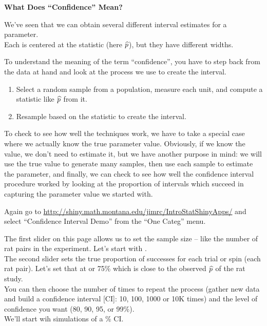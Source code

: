 
\def\theTopic{Confidence }
\def\dayNum{7}

\begin{center}
\vspace*{-.2in}
{\bf {\large What Does ``Confidence'' Mean?}}\\
\end{center}

We've seen that we can obtain several different interval estimates for
a parameter. \\
  Each is centered at the statistic (here $\widehat{p}$), but they have
  different widths.

To understand the meaning of the term ``confidence'', you have to step
back from the data at hand and look at the process we use to create
the interval.
\begin{enumerate}
  \item Select a random sample from a population, measure each unit,
    and compute a  statistic like $\widehat{p}$ from it.
  \item Resample based on the statistic to create the interval.
\end{enumerate}

 To check to see how well the techniques work, we have to take a
 special case where we actually know the true parameter value.
 Obviously, if we know the value, we don't need to estimate it, but we
 have another purpose in mind: we will use the true value to generate
 many samples, then use each sample to estimate the parameter, and
 finally, we can check to see how well the confidence interval
 procedure worked by looking at the proportion of intervals which
 succeed in capturing the parameter value we started with.

 Again go to \url{http://shiny.math.montana.edu/jimrc/IntroStatShinyApps/}
 and select ``Confidence Interval Demo'' from the ``One Categ'' menu.
 
 The first slider on this page allows us to set the sample size --
 like the number of rat pairs in the experiment.  Let's start with
 .\\
 The second slider sets the true proportion of successes for each
 trial or spin (each rat pair).  Let's set that at  or 75\%
 which is close to the observed $\widehat{p}$ of the rat study.\\
 You can then choose the number of times to repeat the process (gather
 new data and build a confidence interval [CI]: 10, 100, 1000 or 10K
 times) and the level of confidence you want (80, 90, 95, or 99\%).\\
 We'll start wih  simulations of a \% CI.

